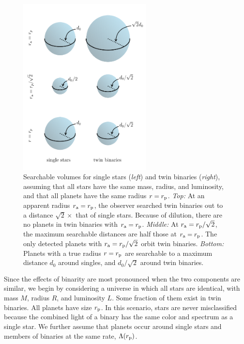 \documentclass[12pt,modern]{aastex61}
\renewcommand{\a}{_{\rm a}}
\newcommand{\p}{_{\rm p}}
\begin{document}
\begin{figure}[!tb]
    \begin{center}
        \includegraphics[width=0.6\textwidth]{figures/visualize_volumes.pdf}
    \end{center}
    \caption{
        Searchable volumes for single stars ({\it left}) and twin
        binaries ({\it right}), assuming that all stars have the same
        mass, radius, and luminosity, and that all planets have the
        same radius $r=r\p$.
        {\it Top:} At an apparent radius $r\a=r\p$, the observer
        searched twin binaries out to a distance $\sqrt{2}\times$ that
        of single stars.  Because of dilution, there are no planets in
        twin binaries with $r\a=r\p$.
        {\it Middle:} At $r\a=r\p/\sqrt{2}$, the maximum searchable
        distances are half those at $r\a=r\p$.  The only detected
        planets with $r\a=r\p/\sqrt{2}$ orbit twin binaries.
        {\it Bottom:} Planets with a true radius $r=r\p$ are
        searchable to a maximum distance $d_0$ around singles, and
        $d_0/\sqrt{2}$ around twin binaries.
    }
    \label{fig:model_1_volumes}
\end{figure}

Since the effects of binarity are most pronounced when the two
components are similar, we begin by considering a universe in which
all stars are identical, with mass $M$, radius $R$, and luminosity
$L$.  Some fraction of them exist in twin binaries. All planets have
size $r\p$.  In this scenario, stars are never misclassified because
the combined light of a binary has the same color and spectrum as a
single star.  We further assume that planets occur around single stars
and members of binaries at the same rate, $\Lambda(r\p)$.
\end{document}

